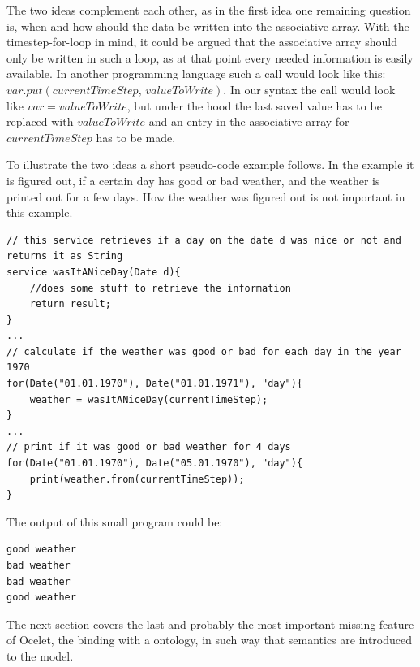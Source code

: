 \par
The two ideas complement each other, as in the first idea one remaining question is, when and how should the data be written into the associative array. With the timestep-for-loop in mind, it could be argued that the associative array should only be written in such a loop, as at that point every needed information is easily available. In another programming language such a call would look like this: $var.put(currentTimeStep,\, valueToWrite)$. In our syntax the call would look like $var = valueToWrite$, but under the hood the last saved value has to be replaced with $valueToWrite$ and an entry in the associative array for $currentTimeStep$ has to be made.
\par
To illustrate the two ideas a short pseudo-code example follows. In the example it is figured out, if a certain day has good or bad weather, and the weather is printed out for a few days. How the weather was figured out is not important in this example.
\begin{lstlisting}[language=Ocelet]
// this service retrieves if a day on the date d was nice or not and returns it as String
service wasItANiceDay(Date d){
	//does some stuff to retrieve the information
	return result;
}
...
// calculate if the weather was good or bad for each day in the year 1970
for(Date("01.01.1970"), Date("01.01.1971"), "day"){
	weather = wasItANiceDay(currentTimeStep);
}
...
// print if it was good or bad weather for 4 days
for(Date("01.01.1970"), Date("05.01.1970"), "day"){
	print(weather.from(currentTimeStep));
}
\end{lstlisting}

\par
The output of this small program could be:
\begin{lstlisting}
good weather
bad weather
bad weather
good weather
\end{lstlisting}
The next section covers the last and probably the most important missing feature of Ocelet, the binding with a ontology, in such way that semantics are introduced to the model.





